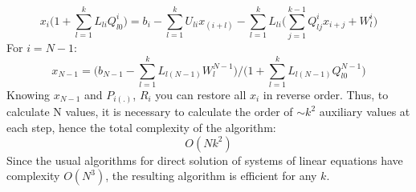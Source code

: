 \documentclass{article}
\begin{document}
\begin{equation}
      x_{i} \Big( 1 +  \sum_{l = 1}^{k} L_{li} Q^{i}_{l0} \Big)  =  b_i - \sum_{l = 1}^{k} U_{li} x_{(i+l)} - \sum_{l = 1}^{k} L_{li} \Big( \sum_{j = 1}^{k-1} Q^{i}_{lj} x_{i + j} + W^{i}_l\Big)
\end{equation}
For $i = N-1$:
\begin{equation}
    x_{N-1} = \Big(b_{N-1} - \sum_{l = 1}^{k} L_{l(N-1)}W^{N-1}_l\Big) / \Big( 1 +  \sum_{l = 1}^{k} L_{l (N-1)} Q^{N-1}_{l0}\Big) 
\end{equation}
Knowing $x_{N-1}$ and $P_{i(.)}$, $R_i$ you can restore all $x_i$ in reverse order. Thus, to calculate N values, it is necessary to calculate the order of $\sim k^2$ auxiliary values at each step, hence the total complexity of the algorithm:
\begin{equation}
    O(Nk^2)
\end{equation}
Since the usual algorithms for direct solution of systems of linear equations have complexity $O(N^3)$, the resulting algorithm is efficient for any $k$.
\end{document}
